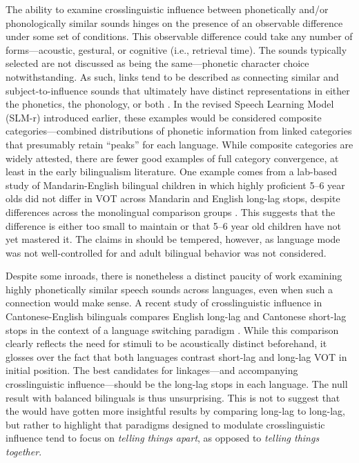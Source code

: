 The ability to examine crosslinguistic influence between phonetically and/or phonologically similar sounds hinges on the presence of an observable difference under some set of conditions. This observable difference could take any number of forms---acoustic, gestural, or cognitive (i.e., retrieval time). The sounds typically selected are not discussed as being the same---phonetic character choice notwithstanding. As such, links tend to be described as connecting similar and subject-to-influence sounds that ultimately have distinct representations in either the phonetics, the phonology, or both \citep{antoniou_2010_context,simonet_2016_bilingualism,bullock_2009_sociophonetics}. In the revised Speech Learning Model (SLM-r) \citep{flege_2021_slmr} introduced earlier, these examples would be considered composite categories---combined distributions of phonetic information from linked categories that presumably retain ``peaks'' for each language. While composite categories are widely attested, there are fewer good examples of full category convergence, at least in the early bilingualism literature. One example comes from a lab-based study of Mandarin-English bilingual children in which highly proficient 5--6 year olds did not differ in VOT across Mandarin and English long-lag stops, despite differences across the monolingual comparison groups \citep{yang_2019_vot}. This suggests that the difference is either too small to maintain or that 5--6 year old children have not yet mastered it. The claims in \citep{yang_2019_vot} should be tempered, however, as language mode was not well-controlled for and adult bilingual behavior was not considered. %

Despite some inroads, there is nonetheless a distinct paucity of work examining highly phonetically similar speech sounds across languages, even when such a connection would make sense. A recent study of crosslinguistic influence in Cantonese-English bilinguals compares English long-lag and Cantonese short-lag stops in the context of a language switching paradigm \citep{tsui_2019_switching}. While this comparison clearly reflects the need for stimuli to be acoustically distinct beforehand, it glosses over the fact that both languages contrast short-lag and long-lag VOT in initial position. The best candidates for linkages---and accompanying crosslinguistic influence---should be the long-lag stops in each language. The null result with balanced bilinguals is thus unsurprising. This is not to suggest that the \citep{tsui_2019_switching} would have gotten more insightful results by comparing long-lag to long-lag, but rather to highlight that paradigms designed to modulate crosslinguistic influence tend to focus on \textit{telling things apart}, as opposed to \textit{telling things together}. %
 
